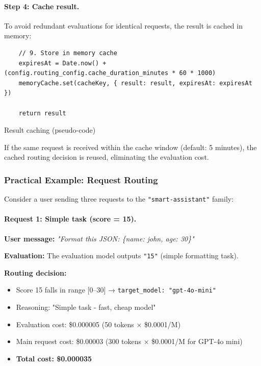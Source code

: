 \documentclass[english]{article}
\begin{document}
\paragraph{Step 4: Cache result.}

To avoid redundant evaluations for identical requests, the result is cached in memory:

\begin{listing}[H]
\begin{verbatim}
    // 9. Store in memory cache
    expiresAt = Date.now() + (config.routing_config.cache_duration_minutes * 60 * 1000)
    memoryCache.set(cacheKey, { result: result, expiresAt: expiresAt })

    return result
\end{verbatim}
\caption{Result caching (pseudo-code)}
\end{listing}

If the same request is received within the cache window (default: 5 minutes), the cached routing decision is reused, eliminating the evaluation cost.

\subsubsection{Practical Example: Request Routing}

Consider a user sending three requests to the \texttt{"smart-assistant"} family:

\paragraph{Request 1: Simple task (score = 15).}

\textbf{User message:} \textit{"Format this JSON: \{name: john, age: 30\}"}

\textbf{Evaluation:} The evaluation model outputs \texttt{"15"} (simple formatting task).

\textbf{Routing decision:}
\begin{itemize}
    \item Score 15 falls in range [0--30] → \texttt{target\_model: "gpt-4o-mini"}
    \item Reasoning: "Simple task - fast, cheap model"
    \item Evaluation cost: \$0.000005 (50 tokens × \$0.0001/M)
    \item Main request cost: \$0.00003 (300 tokens × \$0.0001/M for GPT-4o mini)
    \item \textbf{Total cost: \$0.000035}
\end{itemize}
\end{document}
